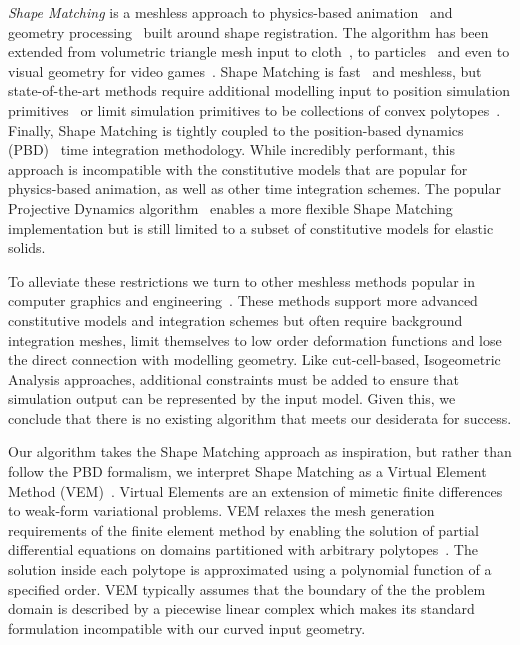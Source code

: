 \emph{Shape Matching} is a meshless approach to physics-based animation~\cite{10.1145/1073204.1073216,10.1145/2019406.2019438} and geometry processing~\cite{10.1111/j.1467-8659.2012.03171.x}
built around shape registration. The algorithm has been extended from volumetric triangle mesh input to cloth~\cite{10.2312/PE/vriphys/vriphys08/039-046}, to particles~\cite{10.1145/1964921.1964987}
and even to visual geometry for video games~\cite{10.1145/2994258.2994260}. 
Shape Matching is fast~\cite{10.1145/1275808.1276480,10.5555/1632592.1632606} and meshless, but state-of-the-art methods require 
additional modelling input to position simulation primitives~\cite{10.1145/1964921.1964987} or limit simulation primitives to be 
collections of convex polytopes~\cite{10.1145/2994258.2994260}.
Finally, Shape Matching is tightly coupled to the position-based dynamics (PBD)~\cite{muller2007position}
time integration methodology. 
While incredibly performant, this approach is incompatible with the constitutive models that are popular for physics-based animation, as well as 
other time integration schemes. 
The popular Projective Dynamics algorithm~\cite{10.1145/2601097.2601116} enables a more flexible Shape Matching implementation but is still limited to a subset of
constitutive models for elastic solids. 

To alleviate these restrictions we turn to other meshless methods popular in computer graphics and 
engineering~\cite{10.1145/1028523.1028542,https://doi.org/10.1002/fld.1650200824,10.1145/1778765.1778776,10.1145/2010324.1964968, 10.1145/1944846.1944855}.
These methods support more advanced constitutive models and integration schemes but often require background integration meshes, limit themselves to low order deformation functions 
and lose the direct connection with
modelling geometry. 
Like cut-cell-based, Isogeometric Analysis approaches, additional constraints must be added to ensure that simulation output can be represented by the input model.
Given this, we conclude that there is no existing algorithm that meets our desiderata for success. 

Our algorithm takes the Shape Matching approach as inspiration, but rather than follow the PBD formalism, we interpret Shape Matching as a 
Virtual Element Method (VEM)~\cite{10.1142/S0218202512500492,10.1142/S021820251440003X}. Virtual Elements are an extension of 
mimetic finite differences~\cite{10.1142/S0218202505000832,10.1016/j.jcp.2013.07.031} to weak-form variational problems. 
VEM relaxes the mesh generation requirements of the finite element method by enabling the solution of partial differential equations
on domains partitioned with arbitrary polytopes~\cite{10.1145/3386569.3392389}. 
The solution inside each polytope is approximated using a polynomial function of a specified order.
VEM typically assumes that the boundary of the the problem domain is described by a piecewise linear complex
which makes its standard formulation incompatible with our curved input geometry. 


